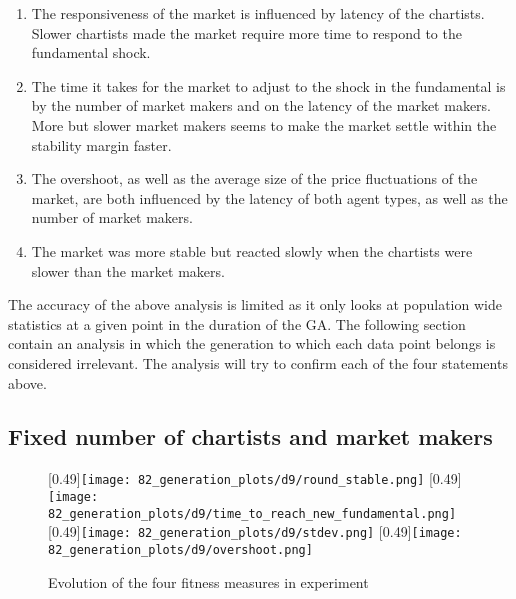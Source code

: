 \begin{enumerate}
\item The responsiveness of the market is influenced by latency of the chartists. Slower chartists made the market require more time to respond to the fundamental shock.
\item The time it takes for the market to adjust to the shock in the fundamental is by the number of market makers and on the latency of the market makers. More but slower market makers seems to make the market settle within the stability margin faster.
\item The overshoot, as well as the average size of the price fluctuations of the market, are both influenced by the latency of both agent types, as well as the number of market makers.
\item The market was more stable but reacted slowly when the chartists were slower than the market makers.
\end{enumerate}
The accuracy of the above analysis is limited as it only looks at population wide statistics at a given point in the duration of the GA. The following section contain an analysis in which the generation to which each data point belongs is considered irrelevant. The analysis will try to confirm each of the four statements above.

\subsection{Fixed number of chartists and market makers}

\begin{figure}
	\centering
	[0.49\linewidth]{\texttt{[image: 82\_generation\_plots/d9/round\_stable.png]}}
	[0.49\linewidth]{\texttt{[image: 82\_generation\_plots/d9/time\_to\_reach\_new\_fundamental.png]}}
	[0.49\linewidth]{\texttt{[image: 82\_generation\_plots/d9/stdev.png]}}
	[0.49\linewidth]{\texttt{[image: 82\_generation\_plots/d9/overshoot.png]}}
	\caption{Evolution of the four fitness measures in experiment \dnine}
	\label{fig:d9_evolution_fitness}
\end{figure}


